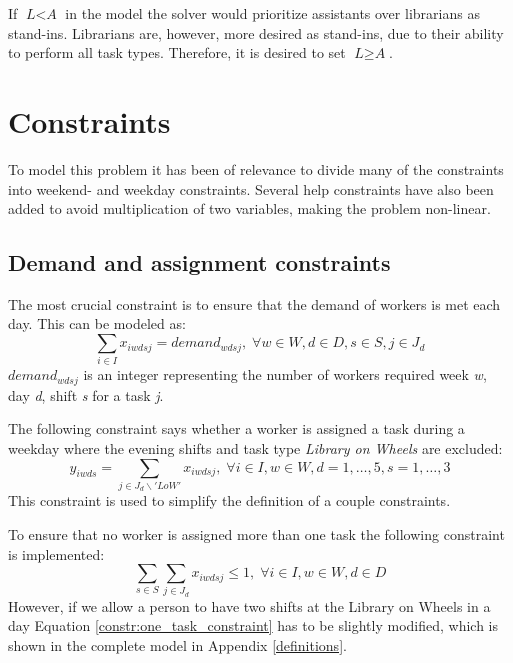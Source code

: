 If $\textit{L} < \textit{A}$ in the model the solver would prioritize assistants over librarians as stand-ins. Librarians are, however, more desired as stand-ins, due to their ability to perform all task types. Therefore, it is desired to set $\textit{L} \geq \textit{A}$.

\section{Constraints} \label{constraints}
To model this problem it has been of relevance to divide many of the constraints into weekend- and weekday constraints. Several help constraints have also been added to avoid multiplication of two variables, making the problem non-linear.

\subsection{Demand and assignment constraints} \label{section:demand_ass_constraints}
The most crucial constraint is to ensure that the demand of workers is met each day. This can be modeled as:
\begin{equation}
\sum_{i \in I} x_{iwdsj} = demand_{wdsj}, \; \forall w\in W,d\in D,s\in S,j\in J_d
\end{equation}
$demand_{wdsj}$ is an integer representing the number of workers required week \textit{w}, day \textit{d}, shift \textit{s} for a task \textit{j}.

The following constraint says whether a worker is assigned a task during a weekday where the evening shifts and task type \textit{Library on Wheels} are excluded:
\begin{equation} \label{constr:y_assign}
y_{iwds} = \sum_{j \in J_d\backslash 'LoW'} x_{iwdsj}, \; \forall i \in I, w \in W, d = 1, \ldots, 5, s = 1,\ldots,3
\end{equation}
This constraint is used to simplify the definition of a couple constraints.

To ensure that no worker is assigned more than one task the following constraint is implemented:
\begin{equation} \label{constr:one_task_constraint}
\sum_{s\in S}\sum_{j\in J_d} x_{iwdsj} \leq 1, \; \forall i\in I, w \in W, d\in D
\end{equation}
However, if we allow a person to have two shifts at the Library on Wheels in a day Equation \ref{constr:one_task_constraint} has to be slightly modified, which is shown in the complete model in Appendix \ref{definitions}.

